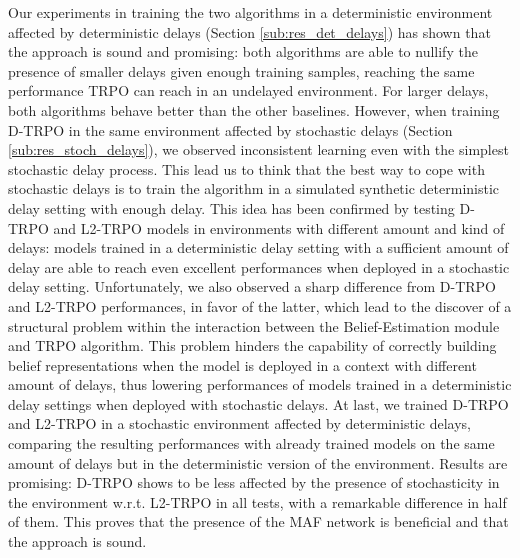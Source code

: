         Our experiments in training the two algorithms in a deterministic environment affected by deterministic delays (Section \ref{sub:res_det_delays}) has shown that the approach is sound and promising: both algorithms are able to nullify the presence of smaller delays given enough training samples, reaching the same performance TRPO can reach in an undelayed environment. For larger delays, both algorithms behave better than the other baselines. However, when training D-TRPO in the same environment affected by stochastic delays (Section \ref{sub:res_stoch_delays}), we observed inconsistent learning even with the simplest stochastic delay process. This lead us to think that the best way to cope with stochastic delays is to train the algorithm in a simulated synthetic deterministic delay setting with enough delay. This idea has been confirmed by testing D-TRPO and L2-TRPO models in environments with different amount and kind of delays: models trained in a deterministic delay setting with a sufficient amount of delay are able to reach even excellent performances when deployed in a stochastic delay setting. Unfortunately, we also observed a sharp difference from D-TRPO and L2-TRPO performances, in favor of the latter, which lead to the discover of a structural problem within the interaction between the Belief-Estimation module and TRPO algorithm. This problem hinders the capability of correctly building belief representations when the model is deployed in a context with different amount of delays, thus lowering performances of models trained in a deterministic delay settings when deployed with stochastic delays. \newline
        At last, we trained D-TRPO and L2-TRPO in a stochastic environment affected by deterministic delays, comparing the resulting performances with already trained models on the same amount of delays but in the deterministic version of the environment. Results are promising: D-TRPO shows to be less affected by the presence of stochasticity in the environment w.r.t. L2-TRPO in all tests, with a remarkable difference in half of them. This proves that the presence of the MAF network is beneficial and that the approach is sound.
        
